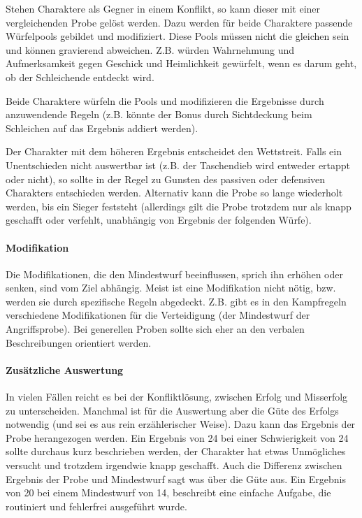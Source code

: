 \documentclass{article}
\begin{document}
Stehen Charaktere als Gegner in einem Konflikt, so kann dieser mit einer vergleichenden Probe gelöst werden. Dazu
werden für beide Charaktere passende Würfelpools gebildet und modifiziert. Diese Pools müssen nicht die gleichen sein
und können gravierend abweichen. Z.B. würden Wahrnehmung und Aufmerksamkeit gegen Geschick und Heimlichkeit gewürfelt,
wenn es darum geht, ob der Schleichende entdeckt wird.

Beide Charaktere würfeln die Pools und modifizieren die Ergebnisse durch anzuwendende Regeln (z.B. könnte der Bonus
durch Sichtdeckung beim Schleichen auf das Ergebnis addiert werden).

Der Charakter mit dem höheren Ergebnis entscheidet den Wettstreit. Falls ein Unentschieden nicht auswertbar ist (z.B.
der Taschendieb wird entweder ertappt oder nicht), so sollte in der Regel zu Gunsten des passiven oder defensiven
Charakters entschieden werden. Alternativ kann die Probe so lange wiederholt werden, bis ein Sieger feststeht
(allerdings gilt die Probe trotzdem nur als knapp geschafft oder verfehlt, unabhängig von Ergebnis der folgenden Würfe).

\paragraph{Modifikation}

Die Modifikationen, die den Mindestwurf beeinflussen, sprich ihn erhöhen oder senken, sind vom Ziel abhängig.
Meist ist eine Modifikation nicht nötig, bzw. werden sie durch spezifische Regeln abgedeckt. Z.B. gibt es in den
Kampfregeln verschiedene Modifikationen für die Verteidigung (der Mindestwurf der Angriffsprobe). Bei generellen Proben
sollte sich eher an den verbalen Beschreibungen orientiert werden.

\paragraph{Zusätzliche Auswertung}

In vielen Fällen reicht es bei der Konfliktlösung, zwischen Erfolg und Misserfolg zu unterscheiden. Manchmal ist für
die Auswertung aber die Güte des Erfolgs notwendig (und sei es aus rein erzählerischer Weise). Dazu kann das Ergebnis
der Probe herangezogen werden. Ein Ergebnis von 24 bei einer Schwierigkeit von 24 sollte durchaus kurz beschrieben
werden, der Charakter hat etwas Unmögliches versucht und trotzdem irgendwie knapp geschafft. Auch die Differenz zwischen
Ergebnis der Probe und Mindestwurf sagt was über die Güte aus. Ein Ergebnis von 20 bei einem Mindestwurf von 14,
beschreibt eine einfache Aufgabe, die routiniert und fehlerfrei ausgeführt wurde.
\end{document}
